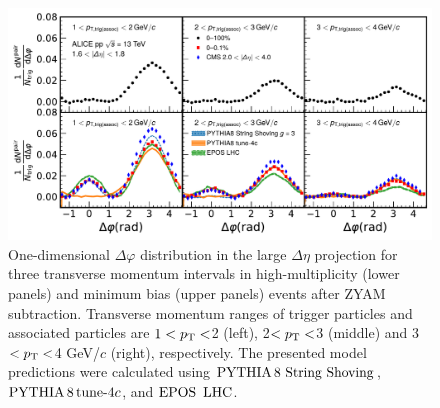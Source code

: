 \begin{figure}[h!]
	\centering
	\includegraphics[width=0.9\linewidth]{./figures/Fig2_PlotDeltaPhi.pdf}
	\caption{One-dimensional $\Delta\varphi$ distribution in the large $\Delta\eta$ projection for three transverse momentum intervals in high-multiplicity (lower panels) and minimum bias (upper panels) events after ZYAM subtraction. Transverse momentum ranges of trigger particles and associated particles are $1<p_\mathrm{T}<$2 (left), 2$<p_\mathrm{T}<$3 (middle) and 3$<p_\mathrm{T}<$4 GeV/$c$ (right), respectively. The presented model predictions were calculated using ${\mathrm{PYTHIA}\,8~\mathrm{String}~}\mathrm{Shoving}$, $\mathrm{PYTHIA}\,8\,\mathrm{tune}{\text -}4c$, and ${\mathrm{EPOS}\,~\mathrm{LHC}}$.}
	\label{fig:PlotDeltaPhi}
\end{figure}
 
